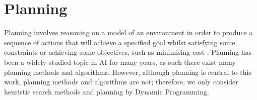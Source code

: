 
\section{Planning}
Planning involves reasoning on a model of an environment in order to produce a sequence of actions that will achieve a specified goal whilst satisfying some constraints or achieving some objectives, such as minimising cost \cite{DBLP:books/aw/RN2020, Lav06, GhallabNauTraverso04}. 
Planning has been a widely studied topic in AI for many years, as such there exist many planning methods and algorithms. However, although planning is central to this work, planning methods and algorithms are not; therefore, we only consider heuristic search methods and planning by Dynamic Programming.

